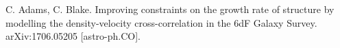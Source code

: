 \documentclass{article}
\begin{document}
\begin{comment}
D_2 &= -\frac{a^2H^2f^2b^2\bar{N}}{8\pi^2} \sum_j \sigma_{j}^{-2}\int r_i^2 dr_i d\Omega_i \iint dk_1dk_2 P(k_1)P(k_2) k_1k_2j_1(k_1|\textbf{r}_i-\textbf{r}_j|)j_1(k_2|\textbf{r}_j-\textbf{r}_i|)\times \\
&\times (\hat{\textbf{r}}_i-\hat{\textbf{r}}_j)\cdot\hat{\textbf{r}}_j(\hat{\textbf{r}}_j-\hat{\textbf{r}}_i)\cdot\hat{\textbf{r}}_j\\
D_3 &= -\frac{\bar{N}a^2H^2f^2b^2}{8\pi^4} \sum_{i}\sigma_i^{-2} \int r^2drd\Omega \iint dk_1dk_2 P(k_1)P(k_2)k_1^2k_2^2(\hat{\textbf{r}_i}-\hat{\textbf{r}})\cdot\hat{\textbf{r}}_i(\hat{\textbf{r}}-\hat{\textbf{r}}_i)\cdot\hat{\textbf{r}}_i\times \\ 
&\times j_1(k_1|\textbf{r}-\textbf{r}_i|)j_1(k_2|\textbf{r}-\textbf{r}_i|)\\
D_4 &=- \frac{1}{2} \sum_{i,j} \sigma_i^{-2}\sigma_j^{-2} \xi_{vv,ij}\xi_{vv,ji}
\end{align*}\par
By similar argument as we did at the end of the previous section, all of the above stay finite in the limit $N_{cell}\to\infty$. In summary, the full likelihood at second order (in $A$, not in $\bar{N}$) is
\[
\boxed{A^2 (S_1 +S_2' +S_4 +S_5 +S_6'+D_2+D_3+D_4)}
\]
where
\begin{align*}
S_2' &=-\frac{a^2H^2f^2b^2\bar{N}}{2\pi^2}\times \\
&\times  \sum_{m,i} \sigma_{m}^{-2}\int r_j^2dr_j d\Omega_j \iint dk_1dk_2 P(k_1)P(k_2) k_1k_2j_1(k_1|\textbf{r}_i-\textbf{r}_m|)j_1(k_2|\textbf{r}_m-\textbf{r}_j|)(\hat{\textbf{r}}_i-\hat{\textbf{r}}_m)\cdot\hat{\textbf{r}}_m \times \\
&\times (\hat{\textbf{r}}_m-\hat{\textbf{r}}_j)\cdot\hat{\textbf{r}}_m \\
S_6' &=-\frac{\bar{N}aHfb}{\pi^2}\sum_{m,j}\sigma_j^{-2} \Delta v_j \sigma_m^{-2} \xi_{vv,mj}\int r_i^2 dr_id\Omega_i\int dk P(k)k j_1(k|\textbf{r}_i-\textbf{r}_m|)(\hat{\textbf{r}}_i-\hat{\textbf{r}}_m)\cdot\hat{\textbf{r}}_m
\end{align*}
after removing the $O(\bar{N}^2)$ terms. Note that $S_3$ and $D_1$ dropped out completely.
\section{Full likelihood to second order}
Adding up both the first and the second order contribution, we have
\[
\mathcal{L} =\boxed{ A^2 (S_1 +S_2'  +S_4 +S_5 +S_6'+D_2+D_3+D_4) +A(s_1+s_2+s_4+s_5+s_6+d_1+d_2)}
\]
with extremum at
\[
\boxed{A^*= -\frac{s_1+s_2+s_4+s_5+s_6+d_1+d_2}{2(S_1 +S_2'  +S_4 +S_5 +S_6'+D_2+D_3+D_4)}}
\]
\end{comment}
\begin{thebibliography}{9}
C. Adams, C. Blake. 
Improving constraints on the growth rate of structure by modelling the density-velocity cross-correlation in the 6dF Galaxy Survey. arXiv:1706.05205 [astro-ph.CO].
\end{thebibliography}
\end{document}
